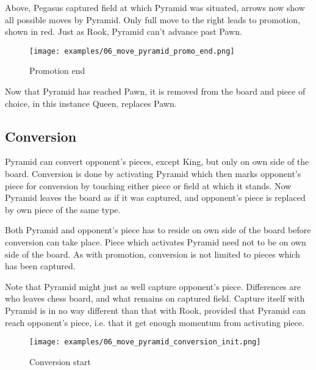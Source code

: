 Above, Pegasus captured field at which Pyramid was situated, arrows now show
all possible moves by Pyramid. Only full move to the right leads to promotion,
shown in red. Just as Rook, Pyramid can't advance past Pawn.

\clearpage %

\noindent
\begin{figure}[!t]
\texttt{[image: examples/06\_move\_pyramid\_promo\_end.png]}
\caption{Promotion end}
\label{fig:ma_promo_end}
\end{figure}

Now that Pyramid has reached Pawn, it is removed from the board and piece of
choice, in this instance Queen, replaces Pawn.

\clearpage %

\subsection*{Conversion}

Pyramid can convert opponent's pieces, except King, but only on own side of
the board. Conversion is done by activating Pyramid which then marks opponent's
piece for conversion by touching either piece or field at which it stands. Now
Pyramid leaves the board as if it was captured, and opponent's piece is replaced
by own piece of the same type.

Both Pyramid and opponent's piece has to reside on own side of the board
before conversion can take place. Piece which activates Pyramid need not
to be on own side of the board. As with promotion, conversion is not limited
to pieces which has been captured.

Note that Pyramid might just as well capture opponent's piece. Differences are
who leaves chess board, and what remains on captured field. Capture itself with
Pyramid is in no way different than that with Rook, provided that Pyramid can
reach opponent's piece, i.e. that it get enough momentum from activating piece.

\clearpage %

\noindent
\begin{figure}[!t]
\texttt{[image: examples/06\_move\_pyramid\_conversion\_init.png]}
\caption{Conversion start}
\label{fig:ma_conversion_init}
\end{figure}

